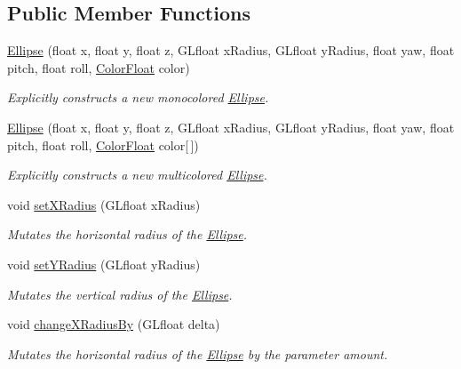 \subsection*{Public Member Functions}
\begin{DoxyCompactItemize}
\item 
\hyperlink{classtsgl_1_1_ellipse_a659436dbb6b37e117cbe98c3c7b23599}{Ellipse} (float x, float y, float z, G\+Lfloat x\+Radius, G\+Lfloat y\+Radius, float yaw, float pitch, float roll, \hyperlink{structtsgl_1_1_color_float}{Color\+Float} color)
\begin{DoxyCompactList}\small\item\em Explicitly constructs a new monocolored \hyperlink{classtsgl_1_1_ellipse}{Ellipse}. \end{DoxyCompactList}\item 
\hyperlink{classtsgl_1_1_ellipse_ac017f7eca9932720288bd261f4f1c9ba}{Ellipse} (float x, float y, float z, G\+Lfloat x\+Radius, G\+Lfloat y\+Radius, float yaw, float pitch, float roll, \hyperlink{structtsgl_1_1_color_float}{Color\+Float} color\mbox{[}$\,$\mbox{]})
\begin{DoxyCompactList}\small\item\em Explicitly constructs a new multicolored \hyperlink{classtsgl_1_1_ellipse}{Ellipse}. \end{DoxyCompactList}\item 
void \hyperlink{classtsgl_1_1_ellipse_a0bbb654f584ad6bb7a89c8fb6e1ecaf1}{set\+X\+Radius} (G\+Lfloat x\+Radius)
\begin{DoxyCompactList}\small\item\em Mutates the horizontal radius of the \hyperlink{classtsgl_1_1_ellipse}{Ellipse}. \end{DoxyCompactList}\item 
void \hyperlink{classtsgl_1_1_ellipse_aca11daaf59dd05b15943597a5f0adfd6}{set\+Y\+Radius} (G\+Lfloat y\+Radius)
\begin{DoxyCompactList}\small\item\em Mutates the vertical radius of the \hyperlink{classtsgl_1_1_ellipse}{Ellipse}. \end{DoxyCompactList}\item 
void \hyperlink{classtsgl_1_1_ellipse_aeee0a38af85a3d72ddef4d10579c2582}{change\+X\+Radius\+By} (G\+Lfloat delta)
\begin{DoxyCompactList}\small\item\em Mutates the horizontal radius of the \hyperlink{classtsgl_1_1_ellipse}{Ellipse} by the parameter amount. \end{DoxyCompactList}\item 

\end{DoxyCompactItemize}
